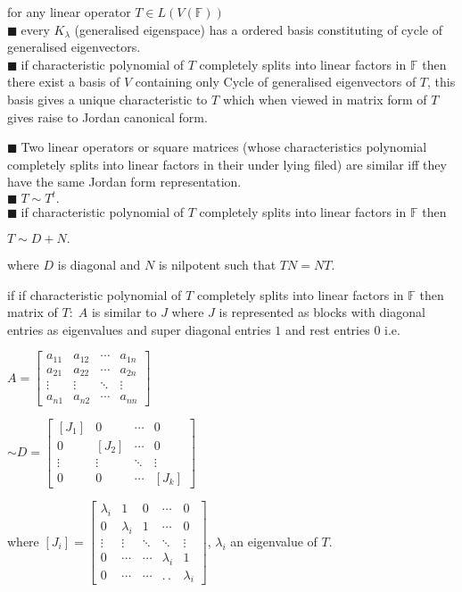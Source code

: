\documentclass[11pt]{extarticle}
\newcommand{\F}{\mathbb{F}}
\newcommand{\ck}{.\,.\,}
\newcommand{\snote}[1]{{\footnotesize(#1)}}
\newcommand{\tbx}[2][]{
	\begin{tcolorbox}[enhanced,breakable,size=small,colback=black!2!white,title={#1},arc is angular, arc=1.5mm,drop fuzzy shadow]
		#2
	\end{tcolorbox}
}
\newcommand{\y}{$\blacksquare\;$}
\newcommand{\yi}{\\$\blacksquare\;$}
\begin{document}
\begin{multicols}{2}
   	   		\tbx[existence Jordan canonical form]{ for any linear operator $ T\in L(V(\F)) $
   	   			\yi every $ K_\lambda $ \snote{generalised eigenspace} has a ordered basis constituting of cycle of generalised eigenvectors.
   	   			\yi if characteristic polynomial of $ T $ completely splits into linear factors in $ \F $ then there exist a basis  of $V $ containing only Cycle of generalised eigenvectors of $ T $, this basis gives a unique characteristic to $ T $ which when viewed in matrix form of $ T $ gives raise to Jordan canonical form.}
   	   			\tbx[Consequences of Jordan Form ]{ \y Two linear operators or square matrices \snote{whose characteristics polynomial  completely splits into linear factors in their under lying filed} are similar iff  they have the same Jordan form representation.
   	   			\yi $ T\sim T^t. $   	 
   	   			\yi if characteristic polynomial of $ T $ completely splits into linear factors in $ \F $ then 
   	   			\begin{center}
   	   				$ T\sim D+N .$
   	   				\end{center} where $ D $ is diagonal and $ N $ is nilpotent such that $ TN=NT $.	}
   	   	\tbx[matrix representation]{ if  if characteristic polynomial of $ T $ completely splits into linear factors in $ \F $ then matrix of $ T: \; A$  is similar to $ J $ where $ J $ is represented as blocks with diagonal entries as eigenvalues and super diagonal entries $ 1 $ and rest entries $ 0 $ i.e.
   	   	\begin{flushleft}
   	   		$ A=\begin{bmatrix}
   	   			a_{11} & a_{12} & \cdots& a_{1n}\\
   	   			a_{21} & a_{22}& \cdots & a_{2n}\\
   	   			\vdots & \vdots & \ddots &\vdots\\
   	   			a_{n1}& a_{n2}&\cdots & a_{nn} 
   	   		\end{bmatrix}  $
   	   	\end{flushleft}
   	   	\begin{flushright}
   	   		$ 
   	   		\sim D=
   	   		\begin{bmatrix}
   	   			[J_{1}] & 0 & \cdots & 0\\
   	   			0& [J_{2}]& \cdots & 0\\
   	   			\vdots & \vdots & \ddots &\vdots\\
   	   			0& 0&\cdots & [J_{k}] 
   	   		\end{bmatrix}  $ 
   	   	\end{flushright} 
   	   		where $ [J_i] =\begin{bmatrix}
   	   		\lambda_i & 1 &0& \cdots &0\\
   	   		0 &	\lambda_i & 1 & \cdots &0\\
   	   		\vdots &\vdots & \ddots &\ddots &\vdots\\
   	   		0&\cdots & \cdots &\lambda_i &1\\
   	   		0&\cdots & \cdots & \ck&\lambda_i 
   	   		\end{bmatrix}$, $ \lambda_i $ an eigenvalue of $ T .$
   	   		}
   	   	

\end{multicols}
\end{document}
